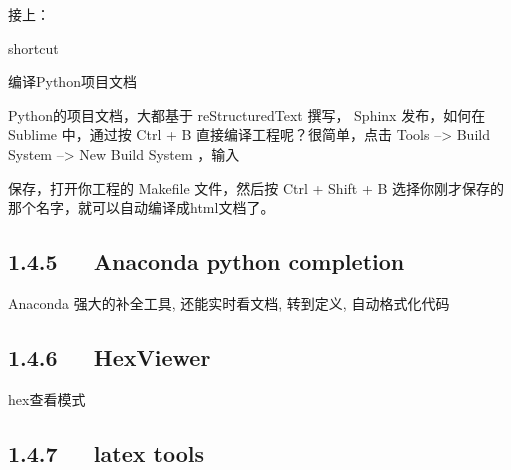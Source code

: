 \documentclass[letterpaper,12pt,english]{sphinxmanual}
\begin{document}
接上：

shortcut

     
  

\sphinxhyphen{}编译Python项目文档

Python的项目文档，大都基于 reStructuredText 撰写， Sphinx 发布，如何在
Sublime 中，通过按 Ctrl + B 直接编译工程呢？很简单，点击 Tools –> Build
System –> New Build System ，输入

\begin{sphinxVerbatim}[commandchars=\\\{\}]
     
\end{sphinxVerbatim}

保存，打开你工程的 Makefile 文件，然后按 Ctrl + Shift + B
选择你刚才保存的那个名字，就可以自动编译成html文档了。


\subsection{1.4.5   Anaconda \sphinxhyphen{} python completion}
\label{\detokenize{001software/001install/sublime:anaconda-python-completion}}
Anaconda 强大的补全工具, 还能实时看文档, 转到定义, 自动格式化代码




\subsection{1.4.6   HexViewer}
\label{\detokenize{001software/001install/sublime:hexviewer}}
hex查看模式


\subsection{1.4.7   latex tools}
\label{\detokenize{001software/001install/sublime:latex-tools}}
\end{document}
